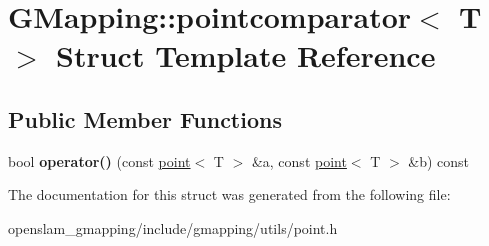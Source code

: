\hypertarget{structGMapping_1_1pointcomparator}{}\section{G\+Mapping\+:\+:pointcomparator$<$ T $>$ Struct Template Reference}
\label{structGMapping_1_1pointcomparator}
\subsection*{Public Member Functions}
\begin{DoxyCompactItemize}
\item 
\mbox{\label{structGMapping_1_1pointcomparator_ac0e0ea9de81827487751bfeba3098e89}} 
bool {\bfseries operator()} (const \hyperlink{structGMapping_1_1point}{point}$<$ T $>$ \&a, const \hyperlink{structGMapping_1_1point}{point}$<$ T $>$ \&b) const
\end{DoxyCompactItemize}


The documentation for this struct was generated from the following file\+:\begin{DoxyCompactItemize}
\item 
openslam\+\_\+gmapping/include/gmapping/utils/point.\+h\end{DoxyCompactItemize}
